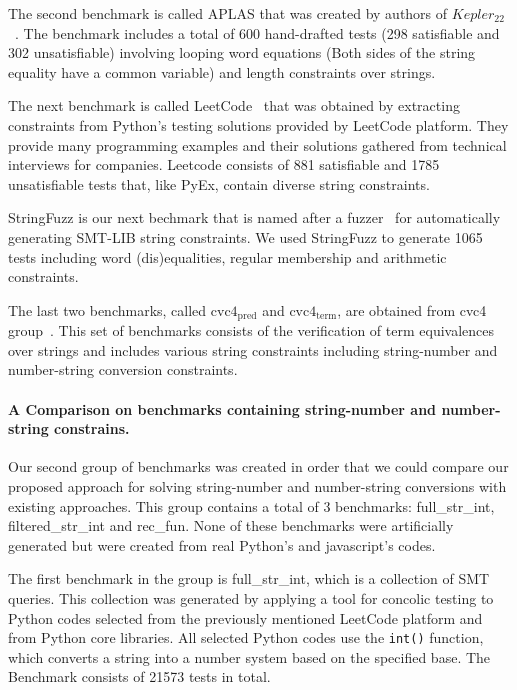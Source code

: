 The second benchmark is called APLAS that was created by authors of \textsf{$Kepler_{22}$}~\cite{aplas}. The benchmark includes a total of 600 hand-drafted tests (298 satisfiable and 302 unsatisfiable) involving looping word equations (Both sides of the string equality have a common variable) and length constraints over strings. 

The next benchmark is called LeetCode~\cite{LeetCode} that was obtained by extracting constraints from Python's testing solutions provided by LeetCode platform. They provide many programming examples and their solutions gathered from technical interviews for companies. Leetcode consists of 881 satisfiable and 1785 unsatisfiable tests that, like PyEx, contain diverse string constraints.

StringFuzz is our next bechmark that is named after a fuzzer~\cite{StringFuzz} for automatically generating SMT-LIB string constraints. We used StringFuzz to generate 1065 tests including word (dis)equalities, regular membership and arithmetic constraints. 

The last two benchmarks, called $\text{cvc4}_{\text{pred}}$ and $\text{cvc4}_{\text{term}}$, are obtained from cvc4 group~\cite{termEQ}. This set of benchmarks consists of the verification of term equivalences over strings and includes various string constraints including string-number and number-string conversion constraints.


\paragraph{A Comparison on benchmarks containing string-number and number-string constrains.}
Our second group of benchmarks was created in order that we could compare our proposed approach for solving string-number and number-string conversions with existing approaches. This group contains a total of 3 benchmarks: full\_str\_int, filtered\_str\_int and rec\_fun. None of these benchmarks were artificially generated but were created from real Python's and javascript's codes.

The first benchmark in the group is full\_str\_int, which is a collection of SMT queries. This collection was generated by applying a tool for concolic testing to Python codes selected from the previously mentioned LeetCode platform and from Python core libraries. All selected Python codes use the \texttt{int()} function, which converts a string into a number system based on the specified base. The Benchmark consists of 21573 tests in total.

